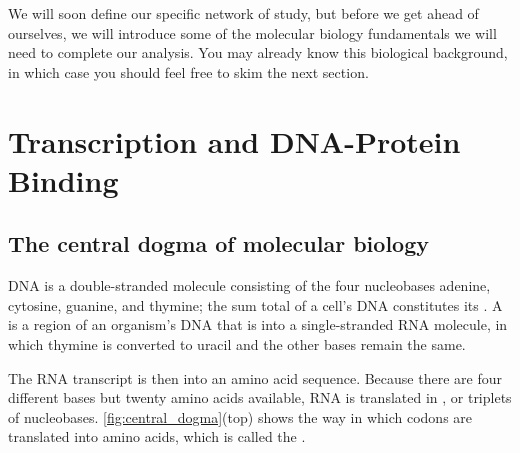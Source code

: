 We will soon define our specific network of study, but before we get ahead of ourselves, we will introduce some of the molecular biology fundamentals we will need to complete our analysis. You may already know this biological background, in which case you should feel free to skim the next section.\\

\FloatBarrier
{}

\section{Transcription and DNA-Protein Binding}
\label{sec:transcription_and_dna-protein_binding}

\subsection{The central dogma of molecular biology}

DNA is a double-stranded molecule consisting of the four nucleobases adenine, cytosine, guanine, and thymine; the sum total of a cell's DNA constitutes its . A  is a region of an organism's DNA that is  into a single-stranded RNA molecule, in which thymine is converted to uracil and the other bases remain the same.

The RNA transcript is then  into an amino acid sequence. Because there are four different bases but twenty amino acids available, RNA is translated in , or triplets of nucleobases. \autoref{fig:central_dogma}(top) shows the way in which codons are translated into amino acids, which is called the .

